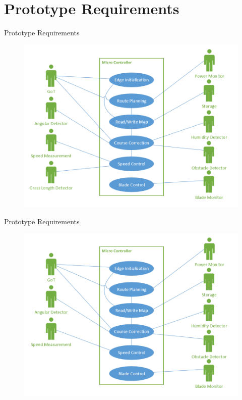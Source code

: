 \section{Prototype Requirements}
\begin{frame}{Prototype Requirements}
\begin{figure}
\includegraphics[width=\textwidth]{Pictures/uc1.png}
\end{figure}
\end{frame}
\begin{frame}{Prototype Requirements}
\begin{figure}
\includegraphics[width=\textwidth]{Pictures/uc2.png}
\end{figure}
\end{frame}
